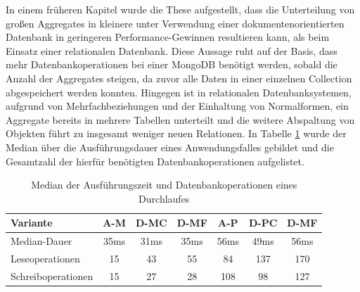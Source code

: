 In einem früheren Kapitel wurde die These aufgestellt, dass die Unterteilung von großen Aggregates in kleinere unter Verwendung einer dokumentenorientierten Datenbank in geringeren Performance-Gewinnen resultieren kann, als beim Einsatz einer relationalen Datenbank. Diese Aussage ruht auf der Basis, dass mehr Datenbankoperationen bei einer MongoDB benötigt werden, sobald die Anzahl der Aggregates steigen, da zuvor alle Daten in einer einzelnen Collection abgespeichert werden konnten. Hingegen ist in relationalen Datenbanksystemen, aufgrund von Mehrfachbeziehungen und der Einhaltung von Normalformen, ein Aggregate bereits in mehrere Tabellen unterteilt und die weitere Abspaltung von Objekten führt zu insgesamt weniger neuen Relationen. In Tabelle \ref{fig:durationofexecution} wurde der Median über die Ausführungsdauer eines Anwendungsfalles gebildet und die Gesamtzahl der hierfür benötigten Datenbankoperationen aufgelistet. 

\begin{table}[htpb!]
	\centering
	\begin{tabular}{ | >{\raggedright\arraybackslash}m{} || c | c | c | c | c | c | } 
		\hline
		\vspace{8pt}
		Variante \vspace{2pt} & A-M & D-MC & D-MF & A-P & D-PC & D-MF \\ 
		\hline
		\vspace{8pt}
		Median-Dauer \vspace{2pt} & 35ms & 31ms & 35ms & 56ms & 49ms & 56ms \\
		\hline
		\vspace{8pt}
		Leseoperationen \vspace{2pt} & 15 & 43 &  55 &  84 & 137 & 170 \\
		\hline
		\vspace{8pt}
		Schreiboperationen \vspace{2pt} & 15 & 27 & 28 & 108 & 98 & 127 \\
		\hline
	\end{tabular}
	\caption{Median der Ausführungszeit und Datenbankoperationen eines Durchlaufes}
	\label{fig:durationofexecution}
\end{table}

\pagebreak

